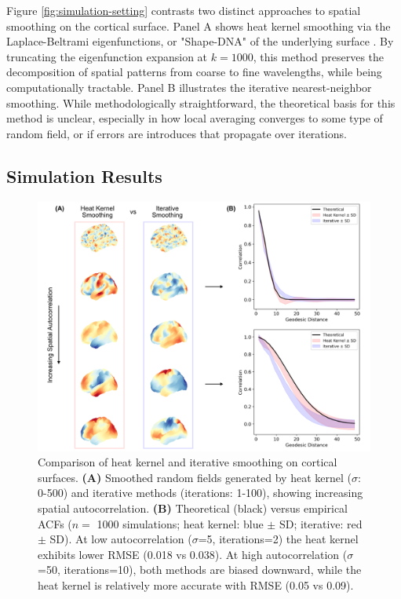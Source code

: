 \documentclass{article}
\begin{document}
Figure \ref{fig:simulation-setting} contrasts two distinct approaches to spatial smoothing on the cortical surface. Panel A shows heat kernel smoothing via the Laplace-Beltrami eigenfunctions, or "Shape-DNA" of the underlying surface \citep{seo_heat_2010, reuter_laplacebeltrami_2006}. By truncating the eigenfunction expansion at $k=1000$, this method preserves the decomposition of spatial patterns from coarse to fine wavelengths, while being computationally tractable. Panel B illustrates the iterative nearest-neighbor smoothing. While methodologically straightforward, the theoretical basis for this method is unclear, especially in how local averaging converges to some type of random field, or if errors are introduces that propagate over iterations. 

\subsection{Simulation Results}
\begin{figure}[!ht]
    \centering
    \includegraphics[width=0.9\linewidth]{project/figures/fig06.png}
    \caption{
    Comparison of heat kernel and iterative smoothing on cortical surfaces.
    \textbf{(A)} Smoothed random fields generated by heat kernel ($\sigma$: 0-500) and iterative methods (iterations: 1-100), showing increasing spatial autocorrelation. 
    \textbf{(B)} Theoretical (black) versus empirical ACFs ($n=$ 1000 simulations; heat kernel: blue $\pm$ SD; iterative: red $\pm$ SD). At low autocorrelation ($\sigma$=5, iterations=2) the heat kernel exhibits lower RMSE (0.018 vs 0.038). At high autocorrelation ($\sigma$=50, iterations=10), both methods are biased downward, while the heat kernel is relatively more accurate with RMSE (0.05 vs 0.09).
    }
    \label{fig:simulation-results}
\end{figure}
\end{document}
